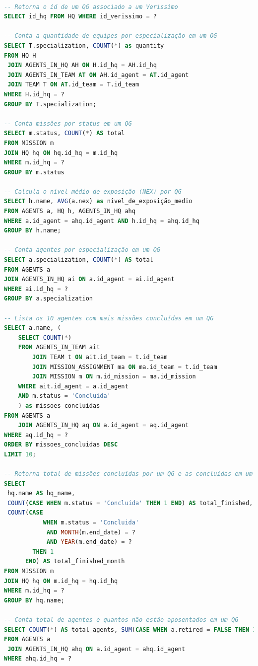 \documentclass[12pt,a4paper]{report}
\begin{document}
\begin{lstlisting}[language=SQL, caption=Consultas feitas em QGDAO]

-- Retorna o id de um QG associado a um Verissimo
SELECT id_hq FROM HQ WHERE id_verissimo = ?

-- Conta a quantidade de equipes por especialização em um QG
SELECT T.specialization, COUNT(*) as quantity
FROM HQ H
 JOIN AGENTS_IN_HQ AH ON H.id_hq = AH.id_hq
 JOIN AGENTS_IN_TEAM AT ON AH.id_agent = AT.id_agent
 JOIN TEAM T ON AT.id_team = T.id_team
WHERE H.id_hq = ?
GROUP BY T.specialization;

-- Conta missões por status em um QG
SELECT m.status, COUNT(*) AS total
FROM MISSION m
JOIN HQ hq ON hq.id_hq = m.id_hq
WHERE m.id_hq = ?
GROUP BY m.status

-- Calcula o nível médio de exposição (NEX) por QG
SELECT h.name, AVG(a.nex) as nivel_de_exposição_medio
FROM AGENTS a, HQ h, AGENTS_IN_HQ ahq
WHERE a.id_agent = ahq.id_agent AND h.id_hq = ahq.id_hq
GROUP BY h.name;

-- Conta agentes por especialização em um QG
SELECT a.specialization, COUNT(*) AS total
FROM AGENTS a
JOIN AGENTS_IN_HQ ai ON a.id_agent = ai.id_agent
WHERE ai.id_hq = ?
GROUP BY a.specialization

-- Lista os 10 agentes com mais missões concluídas em um QG
SELECT a.name, (
    SELECT COUNT(*)
    FROM AGENTS_IN_TEAM ait
        JOIN TEAM t ON ait.id_team = t.id_team
        JOIN MISSION_ASSIGNMENT ma ON ma.id_team = t.id_team
        JOIN MISSION m ON m.id_mission = ma.id_mission
    WHERE ait.id_agent = a.id_agent
    AND m.status = 'Concluida'
    ) as missoes_concluidas
FROM AGENTS a
    JOIN AGENTS_IN_HQ aq ON a.id_agent = aq.id_agent
WHERE aq.id_hq = ?
ORDER BY missoes_concluidas DESC
LIMIT 10;

-- Retorna total de missões concluídas por um QG e as concluídas em um mês específico
SELECT
 hq.name AS hq_name,
 COUNT(CASE WHEN m.status = 'Concluida' THEN 1 END) AS total_finished,
 COUNT(CASE
           WHEN m.status = 'Concluida'
            AND MONTH(m.end_date) = ?
            AND YEAR(m.end_date) = ?
        THEN 1
      END) AS total_finished_month
FROM MISSION m
JOIN HQ hq ON m.id_hq = hq.id_hq
WHERE m.id_hq = ?
GROUP BY hq.name;

-- Conta total de agentes e quantos não estão aposentados em um QG
SELECT COUNT(*) AS total_agents, SUM(CASE WHEN a.retired = FALSE THEN 1 ELSE 0 END) AS active_agents
FROM AGENTS a
 JOIN AGENTS_IN_HQ ahq ON a.id_agent = ahq.id_agent
WHERE ahq.id_hq = ?


\end{lstlisting}
\end{document}
